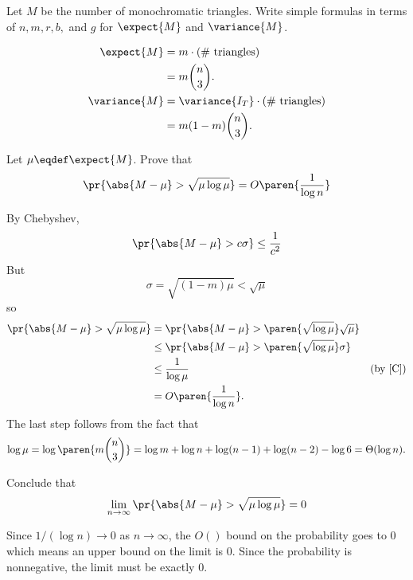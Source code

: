 \documentclass[quiz]{mcs}
\begin{document}
\begin{problem}
\begin{solution}
\end{solution}

\ppart[5] Let $M$ be the number of monochromatic triangles.  Write simple
formulas in terms of $n, m,r,b,$ and $g$ for $\expect{M}$ and
$\variance{M}$.

\exambox{2.0in}{0.5in}{-0.8in}
\examspace[1.0in]


\begin{solution}
\begin{align*}
\expect{M} & =  m \cdot \text{(\# triangles)}\\
           & = m\binom{n}{3}.\\
\variance{M} & = \variance{I_T} \cdot \text{(\# triangles)}\\
           & = m(1-m)\binom{n}{3}.
\end{align*}
\end{solution}


\examspace

\ppart[8]  Let $\mu \eqdef \expect{M}$.  Prove that
\[
\pr{\abs{M - \mu} > \sqrt{\mu \log \mu}} = O \paren{\frac{1}{\log n}}
\]

\examspace{5in}

\begin{solution}
By Chebyshev,
\begin{equation}\label{C}
\pr{\abs{M - \mu} > c \sigma} \leq \frac{1}{c^2}
\end{equation}
But
\[
\sigma = \sqrt{(1-m)\mu} < \sqrt{\mu}
\]
so
\begin{align*}
\pr{\abs{M - \mu} > \sqrt{\mu \log \mu}}
 & = \pr{\abs{M - \mu} > \paren{\sqrt{\log \mu}} \sqrt{\mu}}\\
 & \leq \pr{\abs{M - \mu} > \paren{\sqrt{\log \mu}} \sigma}\\
 & \leq \frac{1}{\log \mu}  & \text{(by~\eqref{C})}\\
 & = O \paren{\frac{1}{\log n}}.
\end{align*}
The last step follows from the fact that
\[
\log \mu = \log \paren{m\binom{n}{3}} = \log m + \log n + \log (n-1) +
\log (n-2) - \log 6 = \Theta(\log n).
\]
\end{solution}

\ppart[3] Conclude that
\[
\lim_{n\to \infty} \pr{\abs{M - \mu} > \sqrt{\mu \log \mu}} = 0
\]

\begin{solution}

Since $1/(\log n) \to 0$ as $n \to \infty$, the $O()$ bound on the
probability goes to 0 which means an upper bound on the limit is 0.  Since
the probability is nonnegative, the limit must be exactly 0.

\end{solution}

\eparts
\end{problem}
\end{document}
